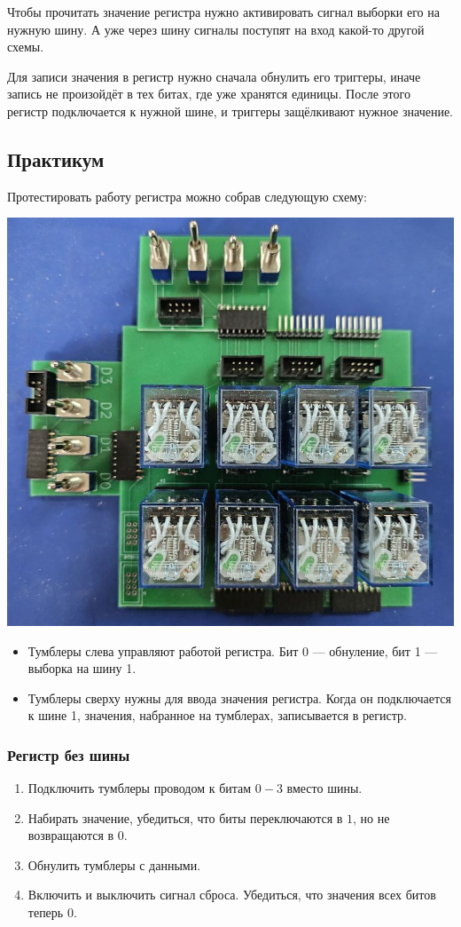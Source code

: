 Чтобы прочитать значение регистра нужно активировать сигнал выборки
его на нужную шину. А уже через шину сигналы поступят на вход какой-то
другой схемы.

Для записи значения в регистр нужно сначала обнулить его триггеры,
иначе запись не произойдёт в тех битах, где уже хранятся единицы.
После этого регистр подключается к нужной шине, и триггеры
защёлкивают нужное значение.

\subsection{Практикум}

Протестировать работу регистра можно собрав следующую схему:

\includegraphics[width=0.5\columnwidth]{photo/register.jpg}

\begin{itemize}
  \item Тумблеры слева управляют работой регистра. Бит 0 --- обнуление, бит 1 --- выборка на шину 1.
  \item Тумблеры сверху нужны для ввода значения регистра. Когда он подключается к шине 1,
        значения, набранное на тумблерах, записывается в регистр.
\end{itemize}

\subsubsection{Регистр без шины}

\begin{enumerate}
    \item Подключить тумблеры проводом к битам $0-3$ вместо шины.
    \item Набирать значение, убедиться, что биты переключаются в $1$, но не возвращаются в $0$.
    \item Обнулить тумблеры с данными.
    \item Включить и выключить сигнал сброса. Убедиться, что значения всех битов теперь $0$.
\end{enumerate}

